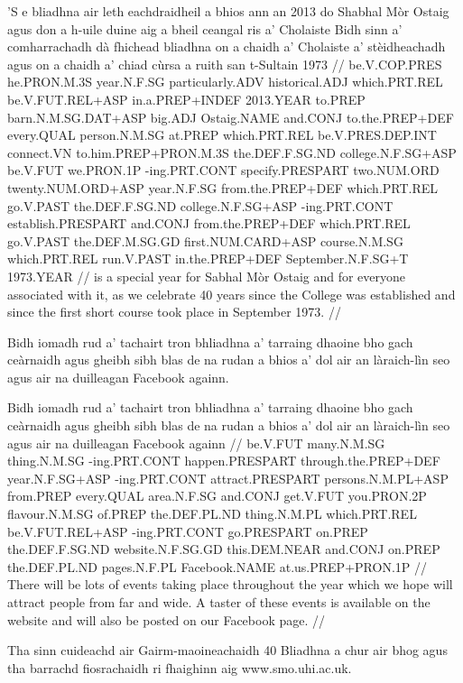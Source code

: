 \documentclass[a4paper,10pt]{article}
\begin{document}
\vspace{4mm}
\gla 'S e bliadhna {air leth} eachdraidheil a bhios {ann an} 2013 do Shabhal Mòr Ostaig agus don {a h-uile} duine aig a bheil ceangal ris a' Cholaiste Bidh sinn a' comharrachadh dà fhichead bliadhna on a chaidh a' Cholaiste a' stèidheachadh agus on a chaidh a' chiad cùrsa a ruith san t-Sultain 1973  //
\glb be.V.COP.PRES he.PRON.M.3S year.N.F.SG particularly.ADV historical.ADJ which.PRT.REL be.V.FUT.REL+ASP in.a.PREP+INDEF 2013.YEAR to.PREP barn.N.M.SG.DAT+ASP big.ADJ Ostaig.NAME and.CONJ to.the.PREP+DEF every.QUAL person.N.M.SG at.PREP which.PRT.REL be.V.PRES.DEP.INT connect.VN to.him.PREP+PRON.M.3S the.DEF.F.SG.ND college.N.F.SG+ASP be.V.FUT we.PRON.1P -ing.PRT.CONT specify.PRESPART two.NUM.ORD twenty.NUM.ORD+ASP year.N.F.SG from.the.PREP+DEF which.PRT.REL go.V.PAST the.DEF.F.SG.ND college.N.F.SG+ASP -ing.PRT.CONT establish.PRESPART and.CONJ from.the.PREP+DEF which.PRT.REL go.V.PAST the.DEF.M.SG.GD first.NUM.CARD+ASP course.N.M.SG which.PRT.REL run.V.PAST in.the.PREP+DEF September.N.F.SG+T 1973.YEAR  //
 is a special year for Sabhal Mòr Ostaig and for everyone associated with it, as we celebrate 40 years since the College was established and since the first short course took place in September 1973. //
\endgl
\xe

\ex
\begingl
\glpre Bidh iomadh rud a' tachairt tron bhliadhna a' tarraing dhaoine bho gach ceàrnaidh agus gheibh sibh blas de na rudan a bhios a' dol air an làraich-lìn seo agus air na duilleagan Facebook againn. 

\vspace{4mm}
\gla Bidh iomadh rud a' tachairt tron bhliadhna a' tarraing dhaoine bho gach ceàrnaidh agus gheibh sibh blas de na rudan a bhios a' dol air an làraich-lìn seo agus air na duilleagan Facebook againn  //
\glb be.V.FUT many.N.M.SG thing.N.M.SG -ing.PRT.CONT happen.PRESPART through.the.PREP+DEF year.N.F.SG+ASP -ing.PRT.CONT attract.PRESPART persons.N.M.PL+ASP from.PREP every.QUAL area.N.F.SG and.CONJ get.V.FUT you.PRON.2P flavour.N.M.SG of.PREP the.DEF.PL.ND thing.N.M.PL which.PRT.REL be.V.FUT.REL+ASP -ing.PRT.CONT go.PRESPART on.PREP the.DEF.F.SG.ND website.N.F.SG.GD this.DEM.NEAR and.CONJ on.PREP the.DEF.PL.ND pages.N.F.PL Facebook.NAME at.us.PREP+PRON.1P  //
\glft There will be lots of events taking place throughout the year which we hope will attract people from far and wide. A taster of these events is available on the website and will also be posted on our Facebook page. //
\endgl
\xe

\ex
\begingl
\glpre Tha sinn cuideachd air Gairm-maoineachaidh 40 Bliadhna a chur air bhog agus tha barrachd fiosrachaidh ri fhaighinn aig www.smo.uhi.ac.uk. 
\end{document}
